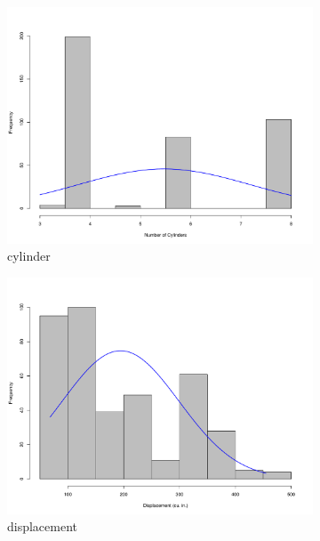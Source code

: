 \documentclass{homework}
\begin{document}
\begin{figure}[h]
    \centering
    \begin{subfigure}[b]{0.3\textwidth}
        \includegraphics[width=\textwidth]{graphs/histCyl.pdf}
        \caption{cylinder}
        \label{fig:cylinder}
    \end{subfigure}
    \begin{subfigure}[b]{0.3\textwidth}
        \includegraphics[width=\textwidth]{graphs/histDis.pdf}
        \caption{displacement}
        \label{fig:displacement}
    \end{subfigure}
    \begin{subfigure}[b]{0.3\textwidth}

\end{subfigure}
\end{figure}
\end{document}
